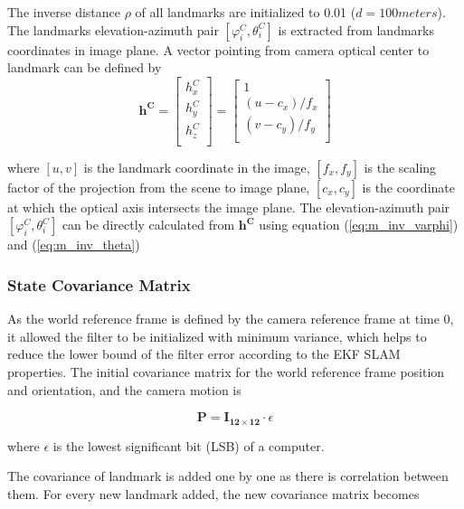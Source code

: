 The inverse distance $\rho$ of all landmarks are initialized to 0.01
($d=100 meters$). The landmarks elevation-azimuth pair $[\varphi _{i}^{C},
\theta _{i}^{C}]$ is extracted from landmarks coordinates in image
plane. A vector pointing from camera optical center to landmark
can be defined by
\begin{equation}
\label{eq:init_landmark_unit_vec}
\mathbf{h^{C}}=\begin{bmatrix}
h_{x}^{C}\\
h_{y}^{C}\\
h_{z}^{C}\\
\end{bmatrix}
 = \begin{bmatrix}
1 \\
(u-c_x)/f_{x} \\
(v-c_y)/f_{y} \\
\end{bmatrix}
\end{equation}

\noindent where $[u, v]$ is the landmark coordinate in the image, $
[f_{x}, f_{y}]$ is the scaling factor of the projection from the scene
to image plane, $[c_x, c_y]$ is the coordinate at which the optical axis
intersects the image plane. The elevation-azimuth pair $[\varphi
_{i}^{C}, \theta _{i}^{C}]$ can be directly calculated from
$\mathbf{h^{C}}$ using equation (\ref{eq:m_inv_varphi}) and (\ref{eq:m_inv_theta})

\subsubsection{State Covariance Matrix}

As the world reference frame is defined by the camera reference frame
at time 0, it allowed the filter to be initialized with minimum
variance, which helps to reduce the lower bound of the filter error
according to the EKF SLAM properties. The initial covariance matrix for the
world reference frame position and orientation, and the camera motion is

\begin{equation}
\label{eq:Pinit}
\mathbf{P}=\mathbf{I_{12\times 12}}\cdot \epsilon 
\end{equation}

\noindent where $\epsilon $ is the lowest significant bit (LSB) of a
computer.

The covariance of landmark is added one by one as there is 
correlation between them. For every new landmark added, the new 
covariance matrix becomes

